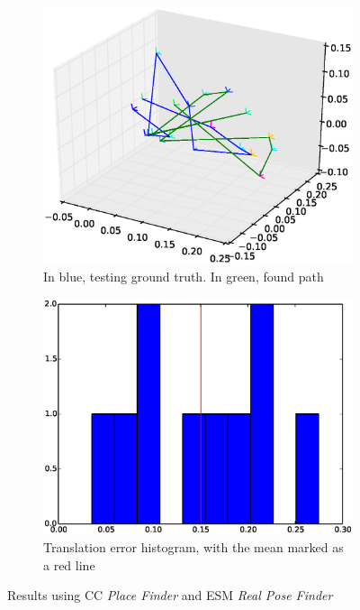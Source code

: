 \begin{figure}[htpb]
  \begin{subfigure}[b]{6cm}
          \includegraphics[width=\linewidth]{img/desktop_2_CC_esm_path_1.eps}
          \caption{In blue, testing ground truth. In green, found path}                
          \label{fig:desktop_2_CC_esm_path_1}
  \end{subfigure}   
  \qquad
  \begin{subfigure}[b]{6cm}
          \includegraphics[width=\linewidth]{img/desktop_2_CC_esm_dist_1.eps}
         \caption{Translation error histogram, with the mean marked as a red line}                
          \label{fig:desktop_2_CC_esm_dist_1}
  \end{subfigure}
  \caption{Results using CC \textit{Place Finder} and ESM  \textit{Real Pose Finder}}
\end{figure}


